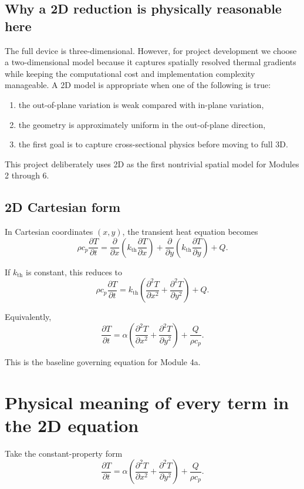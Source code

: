 \documentclass[11pt]{article}
\newcommand{\kth}{k_{\mathrm{th}}}
\begin{document}
\subsection{Why a 2D reduction is physically reasonable here}

The full device is three-dimensional. However, for project development we choose a two-dimensional model because it captures spatially resolved thermal gradients while keeping the computational cost and implementation complexity manageable. A 2D model is appropriate when one of the following is true:
\begin{enumerate}[label=\arabic*.]
    \item the out-of-plane variation is weak compared with in-plane variation,
    \item the geometry is approximately uniform in the out-of-plane direction,
    \item the first goal is to capture cross-sectional physics before moving to full 3D.
\end{enumerate}

This project deliberately uses 2D as the first nontrivial spatial model for Modules 2 through 6.

\subsection{2D Cartesian form}

In Cartesian coordinates $(x,y)$, the transient heat equation becomes
\[
\rho c_p \frac{\partial T}{\partial t}
=
\frac{\partial}{\partial x}\left(\kth \frac{\partial T}{\partial x}\right)
+
\frac{\partial}{\partial y}\left(\kth \frac{\partial T}{\partial y}\right)
+ Q.
\]

If $\kth$ is constant, this reduces to
\[
\rho c_p \frac{\partial T}{\partial t}
=
\kth \left(
\frac{\partial^2 T}{\partial x^2}
+
\frac{\partial^2 T}{\partial y^2}
\right)
+ Q.
\]

Equivalently,
\[
\frac{\partial T}{\partial t}
=
\alpha \left(
\frac{\partial^2 T}{\partial x^2}
+
\frac{\partial^2 T}{\partial y^2}
\right)
+ \frac{Q}{\rho c_p}.
\]

This is the baseline governing equation for Module 4a.

\section{Physical meaning of every term in the 2D equation}

Take the constant-property form
\[
\frac{\partial T}{\partial t}
=
\alpha \left(
\frac{\partial^2 T}{\partial x^2}
+
\frac{\partial^2 T}{\partial y^2}
\right)
+ \frac{Q}{\rho c_p}.
\]
\end{document}
